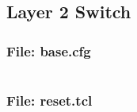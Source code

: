 \documentclass{article}
\begin{document}

\subsection{Layer 2 Switch}
\subsubsection{File: base.cfg}
\inputminted[frame=lines,framesep=2mm,baselinestretch=1.2,bgcolor=lightgray,fontsize=\footnotesize,linenos,breaklines=true]{tcl}{code/l2switch/base.cfg}
\subsubsection{File: reset.tcl}
\inputminted[frame=lines,framesep=2mm,baselinestretch=1.2,bgcolor=lightgray,fontsize=\footnotesize,linenos,breaklines=true]{tcl}{code/l2switch/reset-tcl.txt}

%
%




%
%
\end{document}
